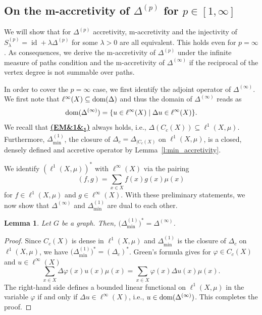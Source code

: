 \documentclass[letterpaper]{article}
\newtheorem{lemma}{Lemma}[section]
\theoremstyle{definition}
\theoremstyle{named}
\numberwithin{equation}{section}
\newcommand{\EM}[1][]{\hyperlink{ass:EM}{\textup{\textbf{(EM\ifx&#1&\else\textsubscript{#1}\fi)}}}}
\newcommand{\lm}{\lambda}
\newcommand{\dom}{\textnormal{dom}} %
\newcommand{\id}{\operatorname{id}}
\newcommand{\Dep}{\Delta^{(p)}}
\newcommand{\Sep}{S_\lambda^{(p)}}
\begin{document}
\subsection{\texorpdfstring{On the m-accretivity of $\Delta^{(p)}$ for $p\in[1,\infty]$}{On the m-accretivity of Delta p for p in [1,infty]}}
We will show that for $\Dep$ accretivity, m-accretivity
and the injectivity of $\Sep=\id+\lm \Dep$ 
for some $\lm>0$ are all equivalent. This holds even for $p=\infty$.  
As consequences, we derive the m-accretivity of $\Dep$ under 
the infinite measure of paths condition
and the m-accretivity of $\Delta^{(\infty)}$ if the reciprocal of the vertex degree is not summable
over paths.


In order to cover the $p=\infty$ case, we first identify the adjoint operator of $\Delta^{(\infty)}$.
We first note that $\ell^\infty(X) \subseteq \dom(\Delta)$ and thus the domain of $\Delta^{(\infty)}$
reads as
$$\dom(\Delta^{(\infty)})= \{ u\in \ell^\infty(X) \mid \Delta u \in \ell^\infty(X)\}.$$
We recall that \EM[1] always holds, i.e., $\Delta(C_c(X))\subseteq \ell^1(X,\mu)$. Furthermore, 
$\Delta_{\min}^{(1)}$, the closure of $\Delta_c=\Delta_{|C_c(X)}$ on $\ell^1(X,\mu)$, 
is a closed, densely defined and accretive operator by Lemma~\ref{l:min_accretivity}. 

We identify $(\ell^1(X,\mu))^{\ast}$ with $\ell^\infty(X)$ via the pairing
\[
(f,g)=\sum_{x\in X}f(x)g(x)\mu(x)
\]
for $f\in\ell^1(X,\mu)$ and $g\in\ell^\infty(X)$. With these preliminary statements, we now
show that $\Delta^{(\infty)}$ and $\Delta_{\min}^{(1)}$ are dual to each other.

\begin{lemma}\label{l:infty_adjoint} 
Let $G$ be a graph.
Then, $\bigl(\Delta_{\min}^{(1)}\bigr)^{\ast}=\Delta^{(\infty)}$.
\end{lemma}
\begin{proof}
Since $C_c(X)$ is dense in $\ell^1(X,\mu)$ and $\Delta_{\min}^{(1)}$ is the closure of $\Delta_c$ on $\ell^1(X,\mu)$, we have $\bigl(\Delta_{\min}^{(1)}\bigr)^{\ast}=(\Delta_c)^{\ast}$. Green's formula \cite[Proposition~1.5]{keller2021graphs} gives for $\varphi\in C_c(X)$ and $u\in\ell^\infty(X)$
\[
\sum_{x\in X}\Delta\varphi(x)u(x)\mu(x)
=
\sum_{x\in X}\varphi(x)\Delta u(x)\mu(x).
\]
The right-hand side defines a bounded linear functional on $\ell^1(X,\mu)$ in the variable $\varphi$ if and only if $\Delta u\in\ell^\infty(X)$, i.e., $u \in \dom(\Delta^{(\infty)})$. This completes the proof.
\end{proof}
\end{document}
